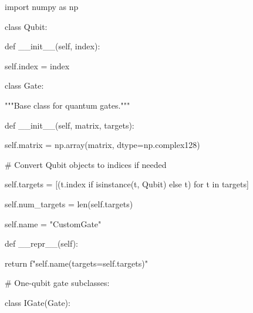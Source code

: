 \documentclass[%
oneside,                 %
final,                   %
10pt]{article}
\begin{document}
\bpycod
import numpy as np



class Qubit:

    def __init__(self, index):

        self.index = index



class Gate:

    """Base class for quantum gates."""

    def __init__(self, matrix, targets):

        self.matrix = np.array(matrix, dtype=np.complex128)

        # Convert Qubit objects to indices if needed

        self.targets = [(t.index if isinstance(t, Qubit) else t) for t in targets]

        self.num_targets = len(self.targets)

        self.name = "CustomGate"



    def __repr__(self):

        return f"{self.name}(targets={self.targets})"



# One-qubit gate subclasses:

class IGate(Gate):
\end{document}
